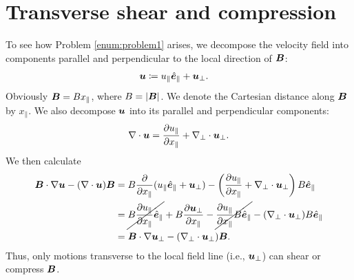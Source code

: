 \documentclass[12pt]{article}
\newcommand{\xpar}{x_\parallel}
\newcommand{\epar}{\e_\parallel}
\newcommand{\upar}{u_\parallel}
\newcommand{\uperp}{\vecu_\perp}
\begin{document}
\section{Transverse shear and compression}
To see how Problem \ref{enum:problem1} arises, we decompose the velocity field into components parallel and perpendicular to the local direction of $\bm{B}$:
\begin{align}
	\vecu &\define \upar\epar + \uperp.
\end{align} 
Obviously $\vecb=B\xpar$, where $B=|\bm{B}|$. We denote the Cartesian distance along $\bm{B}$ by $\xpar$. We also decompose $\bm{u}$ into its parallel and perpendicular components:
\begin{align}
	\Div\vecu=\pderiv{\upar}{\xpar}+\nabla_\perp\cdot\uperp.
\end{align}
We then calculate
\begin{align}
	\vecb\dotgrad\vecu - (\Div\vecu)\vecb&=B\pderiv{}{\xpar}(\upar\epar + \uperp) -\left(\pderiv{\upar}{\xpar}+\nabla_\perp\cdot\uperp\right)B\epar\nonumber\\
	&= \cancel{B\pderiv{\upar}{\xpar}\epar} + B\pderiv{\uperp}{\xpar} -\cancel{\pderiv{\upar}{\xpar} B\epar} - (\nabla_\perp\cdot\uperp)B\epar\nonumber\\
	&= \vecb\dotgrad\uperp - (\nabla_\perp\cdot\uperp)\vecb.
\end{align}
Thus, only motions transverse to the local field line (i.e., $\uperp$) can shear or compress $\bm{B}$.  
\end{document}
